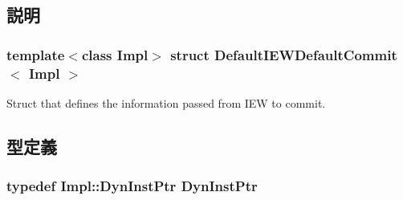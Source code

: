 \subsection{説明}
\subsubsection*{template$<$class Impl$>$ struct DefaultIEWDefaultCommit$<$ Impl $>$}

Struct that defines the information passed from IEW to commit. 

\subsection{型定義}
\hypertarget{structDefaultIEWDefaultCommit_a028ce10889c5f6450239d9e9a7347976}{
\subsubsection[{DynInstPtr}]{\setlength{\rightskip}{0pt plus 5cm}typedef Impl::DynInstPtr {\bf DynInstPtr}}}
\label{structDefaultIEWDefaultCommit_a028ce10889c5f6450239d9e9a7347976}


